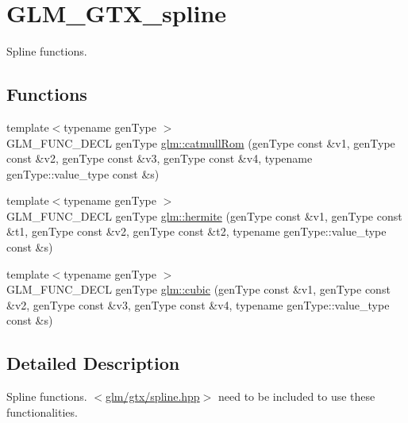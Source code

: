 \hypertarget{group__gtx__spline}{\section{G\-L\-M\-\_\-\-G\-T\-X\-\_\-spline}
\label{group__gtx__spline}
}


Spline functions.  


\subsection*{Functions}
\begin{DoxyCompactItemize}
\item 
{\footnotesize template$<$typename gen\-Type $>$ }\\G\-L\-M\-\_\-\-F\-U\-N\-C\-\_\-\-D\-E\-C\-L gen\-Type \hyperlink{group__gtx__spline_ga8119c04f8210fd0d292757565cd6918d}{glm\-::catmull\-Rom} (gen\-Type const \&v1, gen\-Type const \&v2, gen\-Type const \&v3, gen\-Type const \&v4, typename gen\-Type\-::value\-\_\-type const \&s)
\item 
{\footnotesize template$<$typename gen\-Type $>$ }\\G\-L\-M\-\_\-\-F\-U\-N\-C\-\_\-\-D\-E\-C\-L gen\-Type \hyperlink{group__gtx__spline_gaa69e143f6374d32f934a8edeaa50bac9}{glm\-::hermite} (gen\-Type const \&v1, gen\-Type const \&t1, gen\-Type const \&v2, gen\-Type const \&t2, typename gen\-Type\-::value\-\_\-type const \&s)
\item 
{\footnotesize template$<$typename gen\-Type $>$ }\\G\-L\-M\-\_\-\-F\-U\-N\-C\-\_\-\-D\-E\-C\-L gen\-Type \hyperlink{group__gtx__spline_ga6b867eb52e2fc933d2e0bf26aabc9a70}{glm\-::cubic} (gen\-Type const \&v1, gen\-Type const \&v2, gen\-Type const \&v3, gen\-Type const \&v4, typename gen\-Type\-::value\-\_\-type const \&s)
\end{DoxyCompactItemize}


\subsection{Detailed Description}
Spline functions. $<$\hyperlink{spline_8hpp}{glm/gtx/spline.\-hpp}$>$ need to be included to use these functionalities. 

